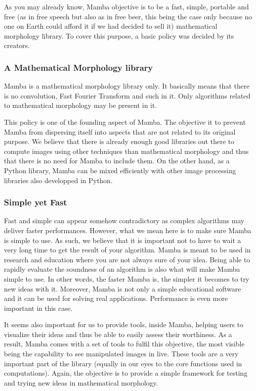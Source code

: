 \documentclass[a4paper,10pt,oneside]{article}
\begin{document}
As you may already know, Mamba objective is to be a fast, simple,
portable and free (as in free speech but also as in free beer, this
being the case only because no one on Earth could afford it if we
had decided to sell it) mathematical morphology library. To cover
this purpose, a basic policy was decided by its creators.


\subsubsection{A Mathematical Morphology library}

Mamba is a mathematical morphology library only. It basically means
that there is no convolution, Fast Fourier Transform and such in it.
Only algorithms related to mathematical morphology may be present
in it.

This policy is one of the founding aspect of Mamba. The objective
it to prevent Mamba from dispersing itself into aspects that are not
related to its original purpose. We believe that there is already
enough good libraries out there to compute images using other techniques
than mathematical morphology and thus that there is no need for Mamba
to include them. On the other hand, as a Python library, Mamba can be
mixed efficiently with other image processing libraries also developped
in Python.


\subsubsection{Simple yet Fast}

Fast and simple can appear somehow contradictory as complex algorithms
may deliver faster performances. However, what we mean here is to
make sure Mamba is simple to use. As such, we believe that it is important
not to have to wait a very long time to get the result of your algorithm.
Mamba is meant to be used in research and education where you are
not always sure of your idea. Being able to rapidly evaluate the soundness
of an algorithm is also what will make Mamba simple to use. In other
words, the faster Mamba is, the simpler it becomes to try new ideas
with it. Moreover, Mamba is not only a simple educational software and
it can be used for solving real applications. Performance is even more
important in this case.

It seems also important for us to provide tools, inside Mamba, helping
users to \textquotedbl{}visualize\textquotedbl{} their ideas and thus
be able to easily assess their worthiness. As a result, Mamba comes
with a set of tools to fulfil this objective, the most visible being
the capability to see manipulated images in live. These tools are
a very important part of the library (equally in our eyes to the core
functions used in computations). Again, the objective is to provide
a simple framework for testing and trying new ideas in mathematical
morphology.
\end{document}
